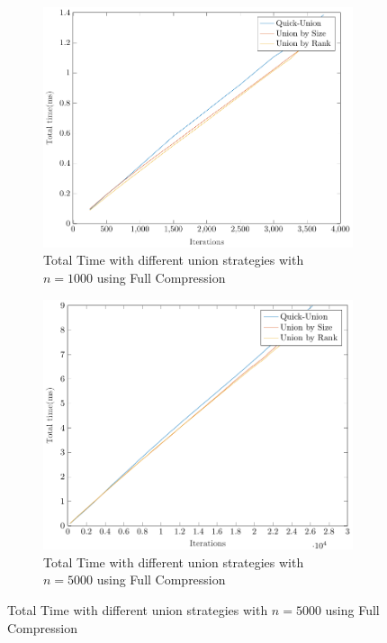 \begin{figure}[ht]
    \centering
    \begin{subfigure}{0.32\textwidth}
        \centering
        \includegraphics[width=\textwidth]{../images/plotFCFull1000_time(ms).pdf}
        \caption{Total Time with different union strategies with $n = 1000$ using Full Compression}
    \end{subfigure}%
    \hfill
    \begin{subfigure}{0.32\textwidth}
        \centering
        \includegraphics[width=\textwidth]{../images/plotFCFull5000_time(ms).pdf}
        \caption{Total Time with different union strategies with $n = 5000$ using Full Compression}

\end{subfigure}
\end{figure}
